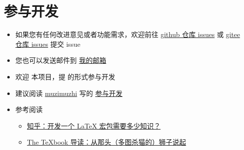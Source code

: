 
\section{参与开发}

\begin{itemize}
  \item 如果您有任何改进意见或者功能需求，欢迎前往 \href{https://github.com/xkwxdyy/CCNUthesis/issues}{github 仓库 issues} 或 \href{https://gitee.com/xkwxdyy/CCNUthesis/issues}{gitee 仓库 issues} 提交 issue
  \item 您也可以发送邮件到 \href{mailto:kangweixia_xdyy@163.com}{我的邮箱}
  \item 欢迎  本项目，提  的形式参与开发
  \item 建议阅读 \href{https://zhuanlan.zhihu.com/typography-and-latex/}{muzimuzhi} 写的 \href{https://github.com/ustctug/ustcthesis/wiki/%E5%8F%82%E4%B8%8E%E5%BC%80%E5%8F%91}{参与开发}
  \item 参考阅读
    \begin{itemize}
      \item \href{https://www.zhihu.com/question/27017364/answer/34932199}{知乎：开发一个 LaTeX 宏包需要多少知识？}
      \item \href{https://zhuanlan.zhihu.com/p/19669122}{The TeXbook 导读：从那头（多图杀猫的）狮子说起}
    \end{itemize}
\end{itemize}